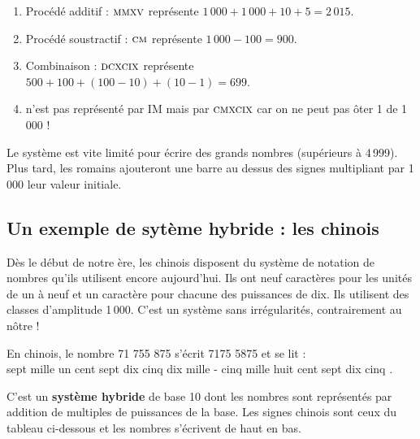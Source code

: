 \begin{exemple*1}   
   \begin{enumerate}
      \item Procédé additif : $\cRm{2015}$ représente $1\,000+1\,000+10+5 =2\,015$.

      \item Procédé soustractif : $\cRm{100}\cRm{1000}$ représente $1\,000-100 =900$.
      \item Combinaison : $\cRm{699}$ représente $500+100+(100-10)+(10-1)=699$.
      \item {} n'est pas représenté par {\small IM} mais par $\cRm{999}$  car on ne peut pas ôter 1 de 1\,000 !
   \end{enumerate}   
\end{exemple*1}  
  
\bigskip
 
   Le système est vite limité pour écrire des grands nombres (supérieurs à 4\,999). Plus tard, les romains ajouteront une barre au dessus des signes multipliant par 1\,000 leur valeur initiale.


\subsection{Un exemple de sytème hybride : les chinois} %

   Dès le début de notre ère, les chinois disposent du système de notation de nombres qu'ils utilisent encore aujourd'hui. Ils ont neuf caractères pour les unités de un à neuf et un caractère pour chacune des puissances de dix. Ils utilisent des classes d'amplitude 1\,000. C'est un système sans irrégularités, contrairement au nôtre !
   
\begin{exemple*1}
   En chinois, le nombre 71 755 875 s'écrit 7175 5875 et se lit : \\
   \og sept mille un cent sept dix cinq dix mille - cinq mille huit cent sept dix cinq \fg. 
\end{exemple*1}

\bigskip

C'est un \textbf{système hybride} de base 10 dont les nombres sont représentés par addition de multiples de puissances de la base. Les signes chinois sont ceux du tableau ci-dessous et les nombres s'écrivent de haut en bas.

